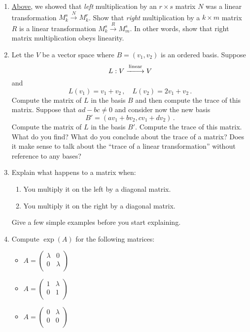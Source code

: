 \begin{enumerate}
\item \label{mat_prob} \hyperlink{leftmult}{Above}, we showed that \emph{left} multiplication by an $r \times s$ matrix $N$  was a linear transformation $M^s_k \stackrel{N}{\longrightarrow} M^r_k$.  Show that \emph{right} multiplication by a $k \times m$ matrix $R$ is a linear transformation $M^s_k \stackrel{R}{\longrightarrow} M^s_m$.  In other words, show that right matrix multiplication obeys linearity.



\item Let the $V$ be a vector space where $B=(v_1,v_2)$ is an ordered basis. Suppose
\[
L:V\stackrel{\rm linear}{-\!\!-\!\!\!\longrightarrow} V
\]
and \[L(v_1)=v_1+v_2 \, ,\quad L(v_2)=2v_1+v_2\, .\] Compute the matrix of $L$ in the basis $B$ and then compute the trace of this matrix.
Suppose that $ad-bc\neq 0$ and consider now the new basis
\[
B'=(av_1+b v_2,cv_1+dv_2)\, .
\]
Compute the matrix of $L$ in the basis $B'$. Compute the trace of this matrix. What do you find? What do you conclude about the trace of a matrix? Does it make sense to talk about the ``trace of a linear transformation'' without reference to any bases? 

\item Explain what happens to a matrix when:
\begin{enumerate}
\item You multiply it on the left by a diagonal matrix.
\item You multiply it on the right by a diagonal matrix.
\end{enumerate}
Give a few simple examples before you start explaining.





\item  \label{expprob}Compute $\exp (A)$ for the following matrices:
\begin{itemize}
\item $A = \begin{pmatrix}
\lambda & 0 \\
0 & \lambda \\
\end{pmatrix}$
\item $A = \begin{pmatrix}
1 & \lambda \\
0 & 1 \\
\end{pmatrix}$
\item $A = \begin{pmatrix}
0 & \lambda \\
0 & 0 \\
\end{pmatrix}$
\end{itemize}


\end{enumerate}
